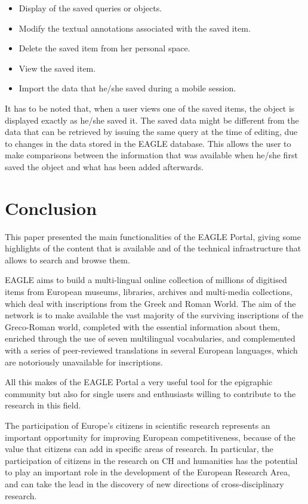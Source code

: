 \documentclass[amsthm,ebook]{saparticle}
\begin{document}
\begin{itemize}
\item Display of the saved queries or objects.
\item Modify the textual annotations associated with the saved item.
\item Delete the saved item from her personal space.
\item View the saved item.
\item Import the data that he/she saved during a mobile session.
\end{itemize}
It has to be noted that, when a user views one of the saved items, the object is displayed exactly as he/she saved it.
The saved data might be different from the data that can be retrieved by issuing the same query at the time of editing,
due to changes in the data stored in the EAGLE database. This allows the user to make comparisons between the
information that was available when he/she first saved the object and what has been added afterwards.

\section{Conclusion}

This paper presented the main functionalities of the EAGLE Portal, giving some highlights of the content that is
available and of the technical infrastructure that allows to search and browse them.

EAGLE aims to build a multi-lingual online collection of millions of digitised items from European museums, libraries,
archives and multi-media collections, which deal with inscriptions from the Greek and Roman World. The aim of the
network is to make available the vast majority of the surviving inscriptions of the Greco-Roman world, completed with
the essential information about them, enriched through the use of seven multilingual vocabularies, and complemented
with a series of peer-reviewed translations in several European languages, which are notoriously unavailable for
inscriptions. 

All this makes of the EAGLE Portal a very useful tool for the epigraphic community but also for single users and
enthusiasts willing to contribute to the research in this field.

The participation of Europe’s citizens in scientific research represents an important opportunity for improving European
competitiveness, because of the value that citizens can add in specific areas of research. In particular, the
participation of citizens in the research on CH and humanities has the potential to play an important role in the
development of the European Research Area, and can take the lead in the discovery of new directions of
cross-disciplinary research.
\end{document}
